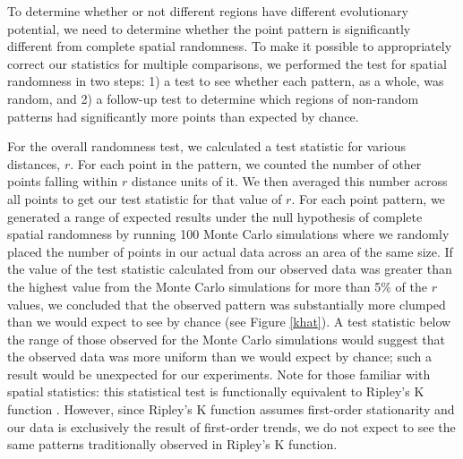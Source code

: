 \documentclass[letterpaper]{article}
\begin{document}
To determine whether or not different regions have different evolutionary potential, we need to determine whether the point pattern is significantly different from complete spatial randomness. To make it possible to appropriately correct our statistics for multiple comparisons, we performed the test for spatial randomness in two steps: 1) a test to see whether each pattern, as a whole, was random, and 2) a follow-up test to determine which regions of non-random patterns had significantly more points than expected by chance. 

For the overall randomness test, we calculated a test statistic for various distances, $r$. For each point in the pattern, we counted the number of other points falling within $r$ distance units of it. We then averaged this number across all points to get our test statistic for that value of $r$. For each point pattern, we generated a range of expected results under the null hypothesis of complete spatial randomness by running 100 Monte Carlo simulations where we randomly placed the number of points in our actual data across an area of the same size. If the value of the test statistic calculated from our observed data was greater than the highest value from the Monte Carlo simulations for more than 5\% of the $r$ values, we concluded that the observed pattern was substantially more clumped than we would expect to see by chance (see Figure \ref{khat}). A test statistic below the range of those observed for the Monte Carlo simulations would suggest that the observed data was more uniform than we would expect by chance; such a result would be unexpected for our experiments. Note for those familiar with spatial statistics: this statistical test is functionally equivalent to Ripley's K function \citep{ripley_mapped_1981}. However, since Ripley's K function assumes first-order stationarity and our data is exclusively the result of first-order trends, we do not expect to see the same patterns traditionally observed in Ripley's K function.
\end{document}

